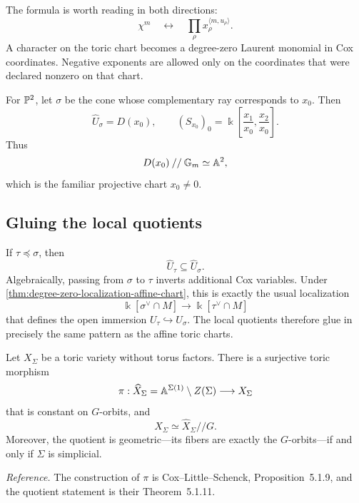 The formula is worth reading in both directions:
\[
\boxed{
\chi^m
\quad\longleftrightarrow\quad
\prod_\rho x_\rho^{\langle m,u_\rho\rangle}.
}
\]
A character on the toric chart becomes a degree-zero Laurent monomial
in Cox coordinates. Negative exponents are allowed only on the
coordinates that were declared nonzero on that chart.

\begin{example}
For \(\mathbb{P}^2\), let \(\sigma\) be the cone whose complementary ray
corresponds to \(x_0\). Then
\[
\widehat U_\sigma=D(x_0),
\qquad
(S_{x_0})_0
=
\Bbbk\left[\frac{x_1}{x_0},\frac{x_2}{x_0}\right].
\]
Thus
\[
D(x_0)\mathbin{//}\mathbb{G}_{m}
\simeq
\mathbb{A}^2,
\]
which is the familiar projective chart \(x_0\neq0\).
\end{example}

\subsection{Gluing the local quotients}

If \(\tau\preceq\sigma\), then
\[
\widehat U_\tau\subseteq\widehat U_\sigma.
\]
Algebraically, passing from \(\sigma\) to \(\tau\) inverts additional
Cox variables. Under
\cref{thm:degree-zero-localization-affine-chart}, this is exactly the
usual localization
\[
\Bbbk[\sigma^\vee\cap M]
\longrightarrow
\Bbbk[\tau^\vee\cap M]
\]
that defines the open immersion \(U_\tau\hookrightarrow U_\sigma\).
The local quotients therefore glue in precisely the same pattern as
the affine toric charts.

\begin{theorem}
\label{thm:cox-quotient-construction}
Let \(X_\Sigma\) be a toric variety without torus factors. There is a
surjective toric morphism
\[
\pi:\widehat X_\Sigma
=
\mathbb{A}^{\Sigma(1)}\setminus Z(\Sigma)
\longrightarrow
X_\Sigma
\]
that is constant on \(G\)-orbits, and
\[
\boxed{
X_\Sigma
\simeq
\widehat X_\Sigma\mathbin{//}G.
}
\]
Moreover, the quotient is geometric---its fibers are exactly the
\(G\)-orbits---if and only if \(\Sigma\) is simplicial.
\end{theorem}

\noindent
\textit{Reference.}
The construction of \(\pi\) is Cox--Little--Schenck,
Proposition~5.1.9, and the quotient statement is their
Theorem~5.1.11.

